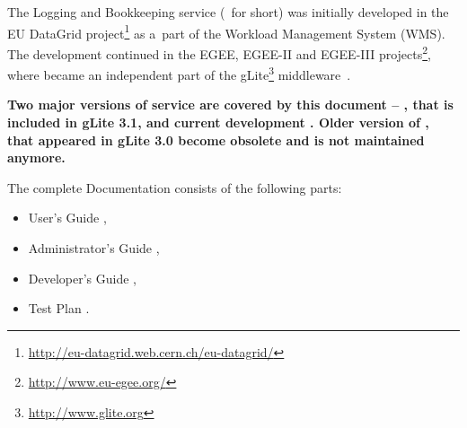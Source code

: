
The Logging and Bookkeeping service (\LB\ for short) was initially developed in
the EU DataGrid
project\footnote{\url{http://eu-datagrid.web.cern.ch/eu-datagrid/}} as a~part
of the Workload Management System (WMS). The development continued in the EGEE,
EGEE-II and EGEE-III projects\footnote{\url{http://www.eu-egee.org/}}, where
\LB became an independent part of the
gLite\footnote{\url{http://www.glite.org}} middleware~\cite{glite}.

\textbf{Two major versions of \LB service are covered by this document -- \LBold, 
that is included in gLite 3.1, and current development \LBnew. Older version of \LB, 
that appeared in gLite 3.0 become obsolete and is not maintained anymore.}

The complete \LB Documentation consists of the following parts:
\begin{itemize}
\item \LB User's Guide \ifx\insideUG{}\fi,
\item \LB Administrator's Guide \ifx\insideAG{}\fi,
\item \LB Developer's Guide \ifx\insideDG{}\fi,
\item \LB Test Plan \ifx\insideTP{}\fi.
\end{itemize}

